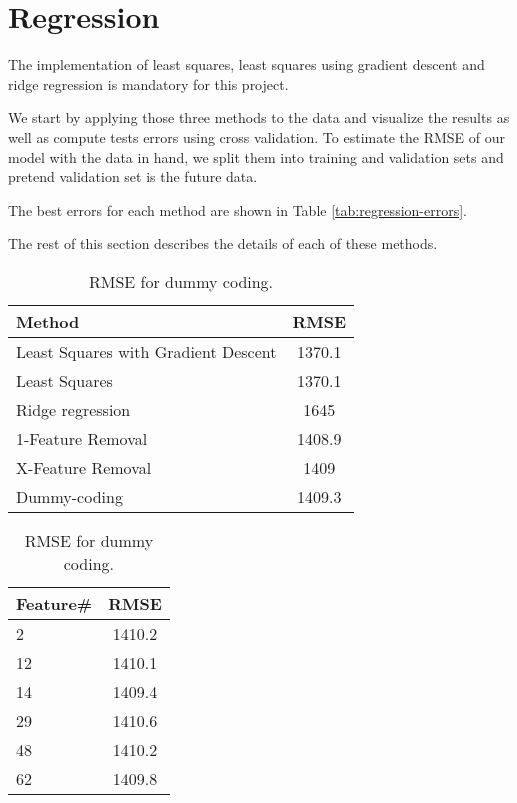 \documentclass{article} %
\begin{document}
\section{Regression}
The implementation of least squares, least squares using gradient descent and ridge regression is mandatory for this project.

We start by applying those three methods to the data and visualize the results  as well as compute tests errors using cross validation.
To  estimate the RMSE of our model with the data in hand, we split them into training and validation sets and pretend validation set is the future data.

The best errors for each method are shown in Table \ref{tab:regression-errors}.

The rest of this section describes the details of each of these methods.

\begin{table}[!htb]
	\begin{minipage}{.5\linewidth}
		\centering

	\begin{center}
		\begin{tabular}{l|c}
			Method & RMSE  \\
			\hline
			Least Squares with Gradient Descent & 1370.1   \\
			Least Squares & 1370.1  \\
			Ridge regression &  1645 \\
			1-Feature Removal &  1408.9 \\
			X-Feature Removal &  1409 \\
			Dummy-coding &  1409.3 \\
		\end{tabular}
		\caption{The best errors for the regression methods tried.}
		\label{tab:regression-errors}
	\end{center}
	
	\end{minipage}
	\begin{minipage}{.5\linewidth}
		\centering
		
	\begin{center}
		\begin{tabular}{l|c}
			Feature\# & RMSE  \\
			\hline
			2 &  1410.2 \\
			12 & 1410.1 \\
			14 &  1409.4 \\
			29 &  1410.6 \\
			48 &  1410.2 \\
			62 &  1409.8 \\
		\end{tabular}
		\caption{RMSE for dummy coding.}
		\label{tab:regression-dummy}
	\end{center}
	
	\end{minipage} 
\end{table}
\end{document}
